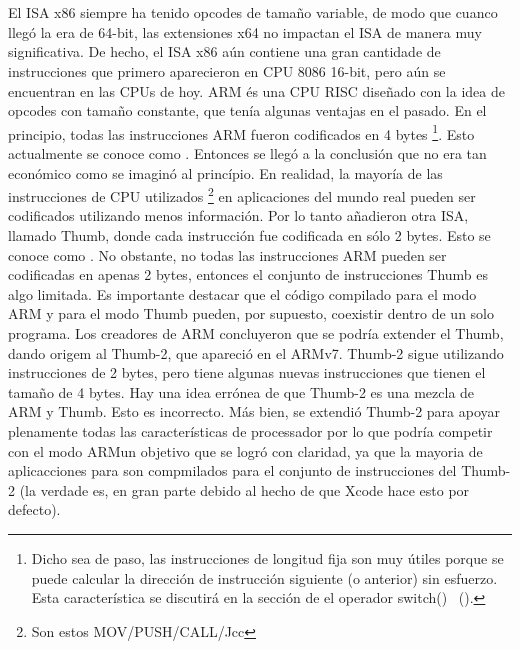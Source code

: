 \ifx\LITE\undefined
{}%
%
%

\section{}
El \ac{ISA} x86 siempre ha tenido opcodes de tamaño variable, de modo que cuanco llegó la era de 64-bit, las extensiones x64 no impactan el \ac{ISA} de manera muy significativa. De hecho, el \ac{ISA} x86 aún contiene una gran cantidade de instrucciones que primero aparecieron en CPU 8086 16-bit, pero aún se encuentran en las CPUs de hoy.
ARM és una \ac{CPU} \ac{RISC} diseñado con la idea de opcodes con tamaño constante, que tenía algunas ventajas en el pasado.
En el principio, todas las instrucciones ARM fueron codificados en 4 bytes%
\footnote{Dicho sea de paso, las instrucciones de longitud fija son muy útiles porque se puede calcular la dirección de instrucción siguiente (o anterior) sin esfuerzo. Esta característica se discutirá en la sección de el operador switch() ~().}.
Esto actualmente se conoce como .
Entonces se llegó a la conclusión que no era tan económico como se imaginó al princípio.
En realidad, la mayoría de las instrucciones de \ac{CPU} utilizados \footnote{Son estos MOV/PUSH/CALL/Jcc} en aplicaciones del mundo real pueden ser codificados utilizando menos información.
Por lo tanto añadieron otra \ac{ISA}, llamado Thumb, donde cada instrucción fue codificada en sólo 2 bytes.
Esto se conoce como .
No obstante, no todas las instrucciones ARM pueden ser codificadas en apenas 2 bytes, entonces el conjunto de instrucciones Thumb es algo limitada.
Es importante destacar que el código compilado para el modo ARM y para el modo Thumb pueden, por supuesto, coexistir dentro de un solo programa.
Los creadores de ARM concluyeron que se podría extender el Thumb, dando origem al Thumb-2, que apareció en el ARMv7.
Thumb-2 sigue utilizando instrucciones de 2 bytes, pero tiene algunas nuevas instrucciones que tienen el tamaño de 4 bytes.
Hay una idea errónea de que Thumb-2 es una mezcla de ARM y Thumb. Esto es incorrecto. 
Más bien, se extendió Thumb-2 para apoyar plenamente todas las características de processador por lo que podría 
competir con el modo ARM\EMDASH{}un objetivo que se logró con claridad, ya que la mayoria de aplicacciones para \idevices son compmilados para el conjunto de instrucciones del Thumb-2 (la verdade es, en gran parte debido al hecho de que Xcode hace esto por defecto).
